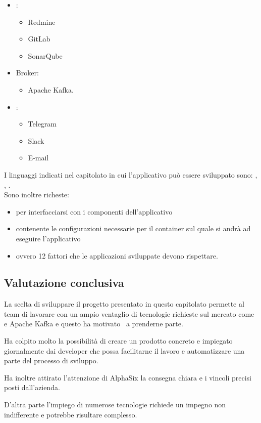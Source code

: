     \begin{itemize}
        \item {}:
        \begin{itemize}
            \item Redmine
            \item GitLab
            \item SonarQube
        \end{itemize}
        \item Broker:
        \begin{itemize}
            \item Apache Kafka.
        \end{itemize}
        \item {}:
        \begin{itemize}
            \item Telegram
            \item Slack
            \item E-mail
        \end{itemize}
    \end{itemize}
    I linguaggi indicati nel capitolato in cui l'applicativo può essere sviluppato sono: , , .\\
    Sono inoltre richeste:
    \begin{itemize}
        \item {} per interfacciarsi con i componenti dell'applicativo
        \item {} contenente le configurazioni necessarie per il container sul quale si andrà ad eseguire l'applicativo
        \item {} ovvero 12 fattori che le applicazioni sviluppate devono rispettare.
    \end{itemize}

    \subsection{Valutazione conclusiva}
    La scelta di sviluppare il progetto presentato in questo capitolato permette al team di lavorare con un ampio ventaglio di tecnologie
    richieste sul mercato come  e Apache Kafka e questo ha motivato \gruppo\ a prenderne parte.\par
    Ha colpito molto la possibilità di creare un prodotto concreto e impiegato giornalmente dai developer che possa facilitarne il lavoro
    e automatizzare una parte del processo di sviluppo.\par
    Ha inoltre attirato l'attenzione di AlphaSix la consegna chiara e i vincoli precisi posti dall'azienda.\par
    D'altra parte l'impiego di numerose tecnologie richiede un impegno non indifferente e potrebbe risultare complesso.
